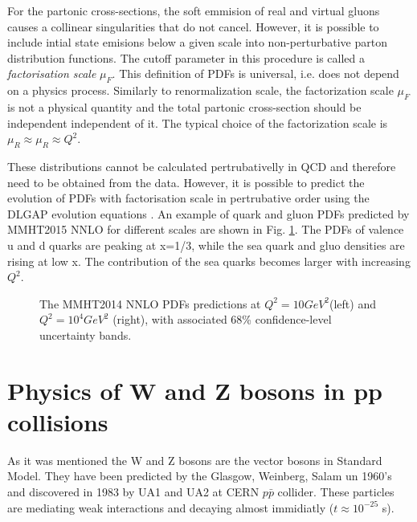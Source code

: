 For the partonic cross-sections, the soft emmision of real and virtual gluons causes a collinear singularities that do not cancel. However, it is possible to include intial state emisions below a given scale into non-perturbative parton distribution functions.  The cutoff parameter in this procedure is called a \textit{factorisation scale} $\mu_F$. This definition of PDFs is universal, i.e. does not depend on a physics process. Similarly to renormalization scale, the factorization scale $\mu_F$ is not a physical quantity and the total partonic cross-section should be independent independent of it. The typical choice of the factorization scale is $\mu_R \approx \mu_R \approx Q^2$.

These distributions cannot be calculated pertrubativelly in QCD and therefore need to be obtained from the data. However, it is possible to predict the evolution of PDFs with factorisation scale in pertrubative order using the DLGAP evolution equations \cite{Gribov:1972ri}. An example of quark and gluon PDFs predicted by MMHT2015 NNLO\cite{MMHT} for different scales are shown in Fig. \ref{fig:PFSMMHT}. The PDFs of valence u and d quarks are peaking at x=1/3, while the sea quark and gluo densities are rising at low x. The contribution of the sea quarks becomes larger with increasing $Q^2$.

\begin{figure}[!tbp]
\caption{The MMHT2014 NNLO PDFs predictions at $Q^2 = 10 GeV^2$(left) and $Q^2 = 10^4 GeV^2$ (right), with associated 68\% confidence-level uncertainty bands.\cite{MMHT}}
\label{fig:PFSMMHT}
\end{figure}

\section{Physics of W and Z bosons in pp collisions}\label{sec:TheoWZ}

As it was mentioned the W and Z bosons are the vector bosons in Standard Model.
They have been predicted by the Glasgow, Weinberg, Salam un 1960's and discovered in 1983 by UA1 and UA2 at CERN $p\bar{p}$ collider\cite{Wdisc1, Wdisc2, Wdisc3, Wdisc4}.  These particles are mediating weak interactions and decaying almost immidiatly ($t \approx 10^{-25}$ s). 

